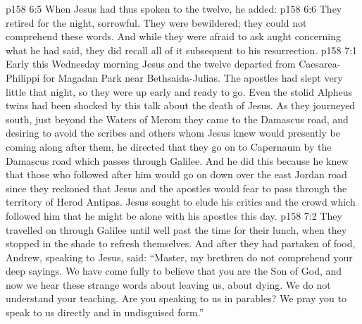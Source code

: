 \vs p158 6:5 When Jesus had thus spoken to the twelve, he added: 
\vs p158 6:6 They retired for the night, sorrowful. They were bewildered; they could not comprehend these words. And while they were afraid to ask aught concerning what he had said, they did recall all of it subsequent to his resurrection.
\vs p158 7:1 Early this Wednesday morning Jesus and the twelve departed from Caesarea\hyp{}Philippi for Magadan Park near Bethsaida\hyp{}Julias. The apostles had slept very little that night, so they were up early and ready to go. Even the stolid Alpheus twins had been shocked by this talk about the death of Jesus. As they journeyed south, just beyond the Waters of Merom they came to the Damascus road, and desiring to avoid the scribes and others whom Jesus knew would presently be coming along after them, he directed that they go on to Capernaum by the Damascus road which passes through Galilee. And he did this because he knew that those who followed after him would go on down over the east Jordan road since they reckoned that Jesus and the apostles would fear to pass through the territory of Herod Antipas. Jesus sought to elude his critics and the crowd which followed him that he might be alone with his apostles this day.
\vs p158 7:2 They travelled on through Galilee until well past the time for their lunch, when they stopped in the shade to refresh themselves. And after they had partaken of food, Andrew, speaking to Jesus, said: “Master, my brethren do not comprehend your deep sayings. We have come fully to believe that you are the Son of God, and now we hear these strange words about leaving us, about dying. We do not understand your teaching. Are you speaking to us in parables? We pray you to speak to us directly and in undisguised form.”
